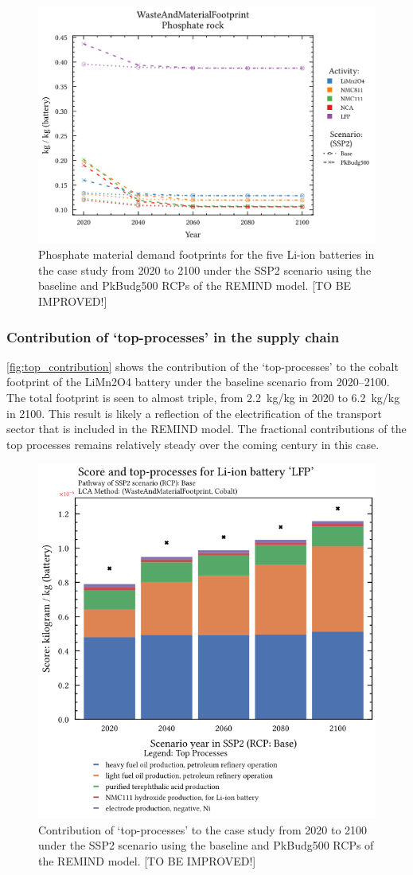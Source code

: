 \begin{figure}[H]
    \centering
    \includegraphics[width=0.7\linewidth]{figures/phosphate.png}
    \caption{Phosphate material demand footprints for the five Li-ion batteries in the case study from 2020 to 2100 under the SSP2 scenario using the baseline and PkBudg500 RCPs of the REMIND model. [TO BE IMPROVED!]}\label{fig:phosphate}
\end{figure}

\subsubsection{Contribution of `top-processes' in the supply chain}\label{sec:results-case_study-topprocesses}

\autoref{fig:top_contribution} shows the contribution of the `top-processes' to the cobalt footprint of the LiMn2O4 battery under the baseline scenario from 2020--2100. The total footprint is seen to almost triple, from 2.2~kg/kg in 2020 to 6.2~kg/kg in 2100. This result is likely a reflection of the electrification of the transport sector that is included in the REMIND model. The fractional contributions of the top processes remains relatively steady over the coming century in this case. 

\begin{figure}[H]
    \centering
    \includegraphics[width=0.6\linewidth]{figures/top-processes.png}
    \caption{Contribution of `top-processes' to the case study from 2020 to 2100 under the SSP2 scenario using the baseline and PkBudg500 RCPs of the REMIND model. [TO BE IMPROVED!]}\label{fig:top_contribution}
\end{figure}

